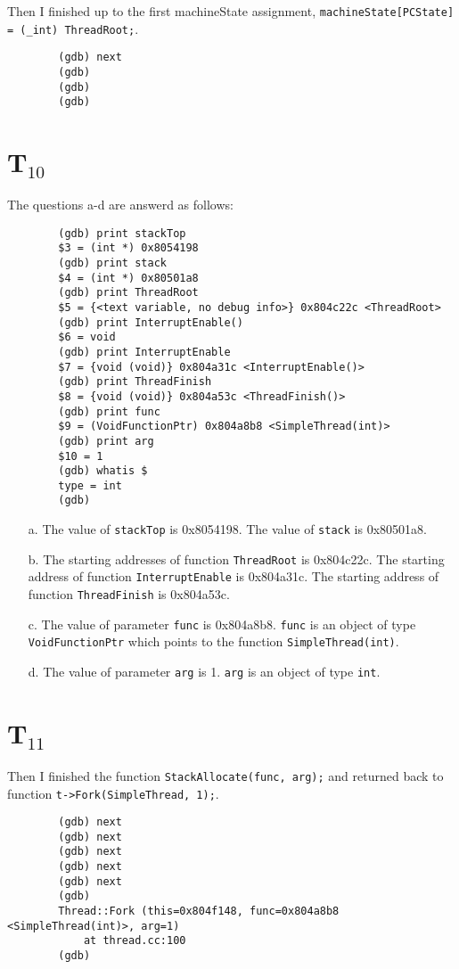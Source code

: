 \documentclass[letterpaper, 10pt]{article}
\begin{document}
	Then I finished up to the first machineState assignment, {\tt machineState[PCState] = (\_int) ThreadRoot;}.

	\begin{verbatim}
		(gdb) next
		(gdb)
		(gdb)
		(gdb)
	\end{verbatim}

	\section*{T$_{10}$}

	The questions a-d are answerd as follows:

	\begin{verbatim}
		(gdb) print stackTop
		$3 = (int *) 0x8054198
		(gdb) print stack
		$4 = (int *) 0x80501a8
		(gdb) print ThreadRoot
		$5 = {<text variable, no debug info>} 0x804c22c <ThreadRoot>
		(gdb) print InterruptEnable()
		$6 = void
		(gdb) print InterruptEnable
		$7 = {void (void)} 0x804a31c <InterruptEnable()>
		(gdb) print ThreadFinish
		$8 = {void (void)} 0x804a53c <ThreadFinish()>
		(gdb) print func
		$9 = (VoidFunctionPtr) 0x804a8b8 <SimpleThread(int)>
		(gdb) print arg
		$10 = 1
		(gdb) whatis $
		type = int
		(gdb)
	\end{verbatim}

	\begin{itemize}
		\item[a.]{The value of {\tt stackTop} is 0x8054198. The value of {\tt stack} is 0x80501a8.}
		\item[b.]{The starting addresses of function {\tt ThreadRoot} is 0x804c22c. The starting address of function {\tt InterruptEnable} is 0x804a31c. The starting address of function {\tt ThreadFinish} is 0x804a53c.}
		\item[c.]{The value of parameter {\tt func} is 0x804a8b8. {\tt func} is an object of type {\tt VoidFunctionPtr} which points to the function {\tt SimpleThread(int)}.}
		\item[d.]{The value of parameter {\tt arg} is 1. {\tt arg} is an object of type {\tt int}.}
	\end{itemize}

	\section*{T$_{11}$}

	Then I finished the function {\tt StackAllocate(func, arg);} and returned back to function {\tt t->Fork(SimpleThread, 1);}.

	\begin{verbatim}
		(gdb) next
		(gdb) next
		(gdb) next
		(gdb) next
		(gdb) next
		(gdb)
		Thread::Fork (this=0x804f148, func=0x804a8b8 <SimpleThread(int)>, arg=1)
			at thread.cc:100
		(gdb)
	\end{verbatim}
\end{document}
